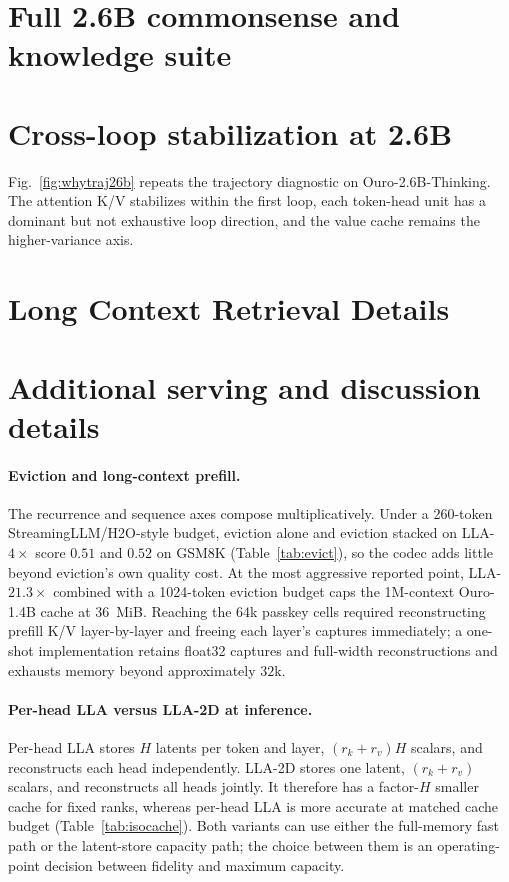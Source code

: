 \documentclass[10pt]{article}
\newcommand{\lla}{LLA}
\begin{document}
\section{Full 2.6B commonsense and knowledge suite}
\label{app:scale_mc}
\TableScaleMC

\section{Cross-loop stabilization at 2.6B}
\label{app:traj26b}
Fig.~\ref{fig:whytraj26b} repeats the trajectory diagnostic on Ouro-2.6B-Thinking. The attention K/V stabilizes within the first loop, each token-head unit has a dominant but not exhaustive loop direction, and the value cache remains the higher-variance axis.
\FigureTrajectoryTwoSix

\section{Long Context Retrieval Details}
\label{app:lc_ds}
\TablePasskey

\section{Additional serving and discussion details}
\label{app:serving_details}
\paragraph{Eviction and long-context prefill.}
The recurrence and sequence axes compose multiplicatively. Under a 260-token StreamingLLM/H2O-style budget, eviction alone and eviction stacked on \lla{}-$4\times$ score $0.51$ and $0.52$ on GSM8K (Table~\ref{tab:evict}), so the codec adds little beyond eviction's own quality cost. At the most aggressive reported point, \lla{}-$21.3\times$ combined with a 1024-token eviction budget caps the 1M-context Ouro-1.4B cache at $36$~MiB. Reaching the $64$k passkey cells required reconstructing prefill K/V layer-by-layer and freeing each layer's captures immediately; a one-shot implementation retains float32 captures and full-width reconstructions and exhausts memory beyond approximately $32$k.

\paragraph{Per-head \lla{} versus \lla{}-2D at inference.}
Per-head \lla{} stores $H$ latents per token and layer, $(r_k+r_v)H$ scalars, and reconstructs each head independently. \lla{}-2D stores one latent, $(r_k+r_v)$ scalars, and reconstructs all heads jointly. It therefore has a factor-$H$ smaller cache for fixed ranks, whereas per-head \lla{} is more accurate at matched cache budget (Table~\ref{tab:isocache}). Both variants can use either the full-memory fast path or the latent-store capacity path; the choice between them is an operating-point decision between fidelity and maximum capacity.
\end{document}
